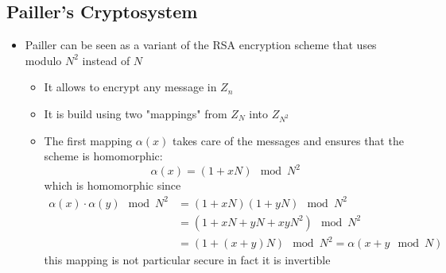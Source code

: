 \subsection{Pailler's Cryptosystem}%
\begin{itemize}
    \item Pailler can be seen as a variant of the RSA encryption scheme that uses modulo $N^2$ instead of $N$
    \begin{itemize}
        \item It allows to encrypt any message in $Z_n$
        \item It is build using two "mappings" from $Z_N$ into $Z_{N^2}$
        \item The first mapping $\alpha(x)$ takes care of the messages and ensures that the scheme is homomorphic:
        \begin{equation*}
            \alpha(x) = (1+ x N) \mod N^2
        \end{equation*}
        which is homomorphic since
        \begin{align*}
            \alpha(x) \cdot \alpha(y) \mod N^2 &= (1 + xN) (1+ yN) \mod N^2 \\
                                &= (1 + xN + yN + xyN^2) \mod N^2 \\
                                &= (1 + (x + y)N) \mod N^2 = \alpha(x + y \mod N)
        \end{align*}
        this mapping is not particular secure in fact it is invertible 


\end{itemize}
\end{itemize}
